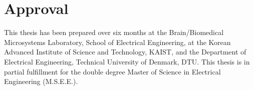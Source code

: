 \thispagestyle{main}

\chapter*{Approval}
This thesis has been prepared over six months at the Brain/Biomedical Microsystems Laboratory, School of Electrical Engineering, at the Korean Advanced Institute of Science and Technology, KAIST, and the Department of Electrical Engineering, Technical University of Denmark, DTU. This thesis is in partial fulfillment for the double degree Master of Science in Electrical Engineering (M.S.E.E.).

\vfill

\begin{center}
\namesigdate{\thesisauthor~-~\studentnumber}
\end{center}
\thispagestyle{empty}
\vfill

